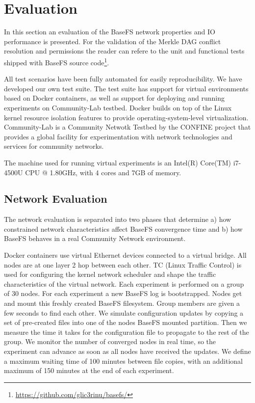 \documentclass{sig-alternate}
\begin{document}
\section{Evaluation} \label{evaluation}

In this section an evaluation of the BaseFS network properties and IO performance is presented. For the validation of the Merkle DAG conflict resolution and permissions the reader can refere to the unit and functional tests shipped with BaseFS source code\footnote{\url{https://github.com/glic3rinu/basefs/}}.

All test scenarios have been fully automated for easily reproducibility. We have developed our own test suite. The test suite has support for virtual environments based on Docker containers, as well as support for deploying and running experiments on Community-Lab testbed\cite{selimi2014cloud}. Docker builds on top of the Linux kernel resource isolation features to provide operating-system-level virtualization. Community-Lab is a Community Netwotk Testbed by the CONFINE project that provides a global facility for experimentation with network technologies and services for community networks. 

The machine used for running virtual experiments is an Intel(R) Core(TM) i7-4500U CPU @ 1.80GHz, with 4 cores and 7GB of memory.


\subsection{Network Evaluation}
The network evaluation is separated into two phases that determine a) how constrained network characteristics affect BaseFS convergence time and b) how BaseFS behaves in a real Community Network environment. 

Docker containers use virtual Ethernet devices connected to a virtual bridge. All nodes are at one layer 2 hop between each other. TC (Linux Traffic Control) is used for configuring the kernel network scheduler and shape the traffic characteristics of the virtual network. Each experiment is performed on a group of 30 nodes. For each experiment a new BaseFS log is bootstrapped. Nodes get and mount this freshly created BaseFS filesystem. Group members are given a few seconds to find each other. We simulate configuration updates by copying a set of pre-created files into one of the nodes BaseFS mounted partition. Then we measure the time it takes for the configuration file to propagate to the rest of the group. We monitor the number of converged nodes in real time, so the experiment can advance as soon as all nodes have received the updates. We define a maximum waiting time of 100 minutes between file copies, with an additional maximum of 150 minutes at the end of each experiment.
\end{document}
